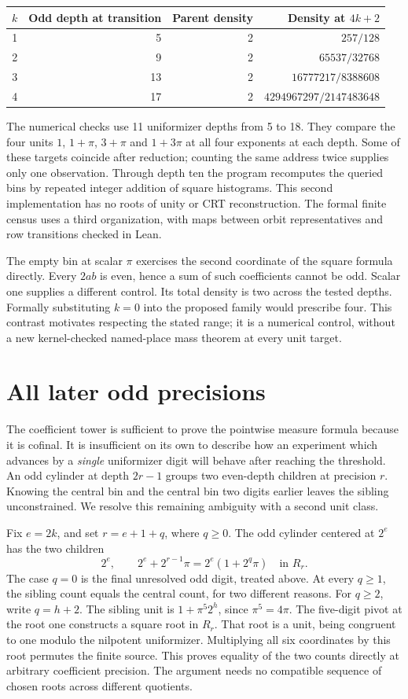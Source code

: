 \documentclass[12pt,letterpaper]{article}
\begin{document}
\begin{center}\small\begin{tabular}{crrr}\toprule
$k$ & Odd depth at transition & Parent density & Density at $4k+2$\\\midrule
1&5&2&$257/128$\\
2&9&2&$65537/32768$\\
3&13&2&$16777217/8388608$\\
4&17&2&$4294967297/2147483648$\\\bottomrule
\end{tabular}\end{center}
The numerical checks use 11 uniformizer depths from 5 to 18. They compare the four units $1$, $1+\pi$, $3+\pi$ and $1+3\pi$ at all four exponents at each depth. Some of these targets coincide after reduction; counting the same address twice supplies only one observation. Through depth ten the program recomputes the queried bins by repeated integer addition of square histograms. This second implementation has no roots of unity or CRT reconstruction. The formal finite census uses a third organization, with maps between orbit representatives and row transitions checked in Lean.

The empty bin at scalar $\pi$ exercises the second coordinate of the square formula directly. Every $2ab$ is even, hence a sum of such coefficients cannot be odd. Scalar one supplies a different control. Its total density is two across the tested depths. Formally substituting $k=0$ into the proposed family would prescribe four. This contrast motivates respecting the stated range; it is a numerical control, without a new kernel-checked named-place mass theorem at every unit target.
\section{All later odd precisions}
The coefficient tower is sufficient to prove the pointwise measure formula because it is cofinal. It is insufficient on its own to describe how an experiment which advances by a \emph{single} uniformizer digit will behave after reaching the threshold. An odd cylinder at depth $2r-1$ groups two even-depth children at precision $r$. Knowing the central bin and the central bin two digits earlier leaves the sibling unconstrained. We resolve this remaining ambiguity with a second unit class.

Fix $e=2k$, and set $r=e+1+q$, where $q\ge0$. The odd cylinder centered at $2^e$ has the two children
\[
     2^e,\qquad 2^e+2^{r-1}\pi=2^e(1+2^q\pi)\quad\text{in }R_r .
\]
The case $q=0$ is the final unresolved odd digit, treated above. At every $q\ge1$, the sibling count equals the central count, for two different reasons. For $q\ge2$, write $q=h+2$. The sibling unit is $1+\pi^5 2^h$, since $\pi^5=4\pi$. The five-digit pivot at the root one constructs a square root in $R_r$. That root is a unit, being congruent to one modulo the nilpotent uniformizer. Multiplying all six coordinates by this root permutes the finite source. This proves equality of the two counts directly at arbitrary coefficient precision. The argument needs no compatible sequence of chosen roots across different quotients.
\end{document}

